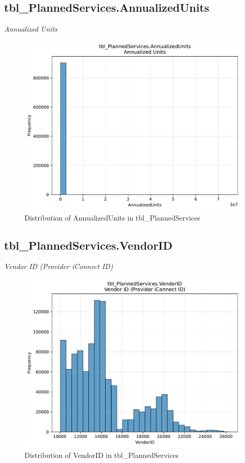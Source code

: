 \subsection{tbl\_PlannedServices.AnnualizedUnits}
\textit{Annualized Units}

\begin{figure}[htbp]
\centering
\includegraphics[width=\textwidth]{figures/dbo_tbl_PlannedServices_AnnualizedUnits.pdf}
\caption{Distribution of AnnualizedUnits in tbl\_PlannedServices}
\end{figure}\newpage

\subsection{tbl\_PlannedServices.VendorID}
\textit{Vendor ID (Provider iConnect ID)}

\begin{figure}[htbp]
\centering
\includegraphics[width=\textwidth]{figures/dbo_tbl_PlannedServices_VendorID.pdf}
\caption{Distribution of VendorID in tbl\_PlannedServices}
\end{figure}\newpage

